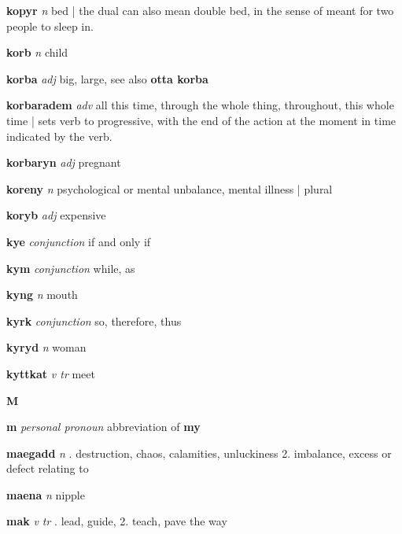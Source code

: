 \textbf{kopyr}   \emph{n} \textperiodcentered bed | the dual can also mean double bed, in the sense of meant for two people to sleep in.

\textbf{korb}   \emph{n} \textperiodcentered child

\textbf{korba}   \emph{adj} \textperiodcentered big, large, see also \textbf{otta korba}

\textbf{korbaradem}   \emph{adv} \textperiodcentered all this time, through the whole thing, throughout, this whole time | sets verb to progressive, with the end of the action at the moment in time indicated by the verb.

\textbf{korbaryn}   \emph{adj} \textperiodcentered pregnant

\textbf{koreny}   \emph{n} \textperiodcentered psychological or mental unbalance, mental illness | plural

\textbf{koryb}   \emph{adj} \textperiodcentered expensive

\textbf{kye}   \emph{conjunction} \textperiodcentered if and only if

\textbf{kym}   \emph{conjunction} \textperiodcentered while, as

\textbf{kyng}   \emph{n} \textperiodcentered mouth

\textbf{kyrk}   \emph{conjunction} \textperiodcentered so, therefore, thus

\textbf{kyryd}   \emph{n} \textperiodcentered woman

\textbf{kyttkat}   \emph{v tr} \textperiodcentered meet

\begin{center} \Huge \bfseries M \end{center}\textbf{m}   \emph{personal pronoun} \textperiodcentered abbreviation of \textbf{my}

\textbf{maegadd}   \emph{n} . destruction, chaos, calamities, unluckiness 2. imbalance, excess or defect relating to \GEN 

\textbf{maena}   \emph{n} \textperiodcentered nipple

\textbf{mak}   \emph{v tr} . lead, guide, 2. teach, pave the way 

